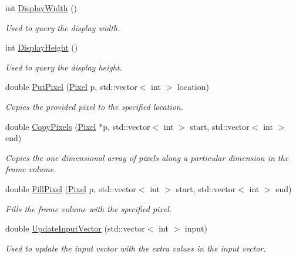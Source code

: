 \begin{DoxyCompactItemize}
\item 
int \hyperlink{classnddi_1_1_base_nddi_display_a26851df678bf1509a00de1b6bf494934}{DisplayWidth} ()
\begin{DoxyCompactList}\small\item\em Used to query the display width. \item\end{DoxyCompactList}\item 
int \hyperlink{classnddi_1_1_base_nddi_display_a655f0d8e4ff09524ec3980f68197841e}{DisplayHeight} ()
\begin{DoxyCompactList}\small\item\em Used to query the display height. \item\end{DoxyCompactList}\item 
double \hyperlink{classnddi_1_1_base_nddi_display_ab1f32fd60cdf81ac01130cefd1d48f0e}{PutPixel} (\hyperlink{unionnddi_1_1_pixel}{Pixel} p, std::vector$<$ int $>$ location)
\begin{DoxyCompactList}\small\item\em Copies the provided pixel to the specified location. \item\end{DoxyCompactList}\item 
double \hyperlink{classnddi_1_1_base_nddi_display_a911540bae3ce34a1fd24b42345735aa4}{CopyPixels} (\hyperlink{unionnddi_1_1_pixel}{Pixel} $\ast$p, std::vector$<$ int $>$ start, std::vector$<$ int $>$ end)
\begin{DoxyCompactList}\small\item\em Copies the one dimensional array of pixels along a particular dimension in the frame volume. \item\end{DoxyCompactList}\item 
double \hyperlink{classnddi_1_1_base_nddi_display_a5037ac944566351b8dbf11486be40bc5}{FillPixel} (\hyperlink{unionnddi_1_1_pixel}{Pixel} p, std::vector$<$ int $>$ start, std::vector$<$ int $>$ end)
\begin{DoxyCompactList}\small\item\em Fills the frame volume with the specified pixel. \item\end{DoxyCompactList}\item 
double \hyperlink{classnddi_1_1_base_nddi_display_ad6e5385ce6ea17f11e3ea404a123d1d7}{UpdateInputVector} (std::vector$<$ int $>$ input)
\begin{DoxyCompactList}\small\item\em Used to update the input vector with the extra values in the input vector. \item\end{DoxyCompactList}\item 

\end{DoxyCompactItemize}
